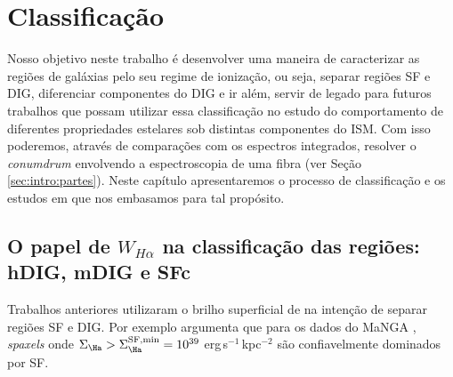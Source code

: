 


\chapter{Classificação}
\label{sec:DIGclass}
Nosso objetivo neste trabalho é desenvolver uma maneira de caracterizar as regiões de galáxias pelo seu regime de ionização, ou seja, separar regiões SF e DIG, diferenciar componentes do DIG e ir além, servir de legado para futuros trabalhos que possam utilizar essa classificação no estudo do comportamento de diferentes propriedades estelares sob distintas componentes do ISM. Com isso poderemos, através de comparações com os espectros integrados, resolver o {\em conumdrum} envolvendo a espectroscopia de uma fibra (ver Seção \ref{sec:intro:partes}). Neste capítulo apresentaremos o processo de classificação e os estudos em que nos embasamos para tal propósito.

\section{O papel de $W_{H\alpha}$ na classificação das regiões: hDIG, mDIG e SFc}
\label{sec:DIGclass:WHa}

Trabalhos anteriores utilizaram o brilho superficial de \Ha na intenção de separar regiões SF e DIG. Por exemplo \citet{Zhang.etal.2017a} argumenta que para os dados do MaNGA \citep{Bundy.etal.2015}, {\em spaxels} onde $\Sigma_{\Ha} > \Sigma_{\Ha}^{\rm SF,min} = 10^{39}$ erg$\,$s$^{-1}\,$kpc$^{-2}$ são confiavelmente dominados por SF.

